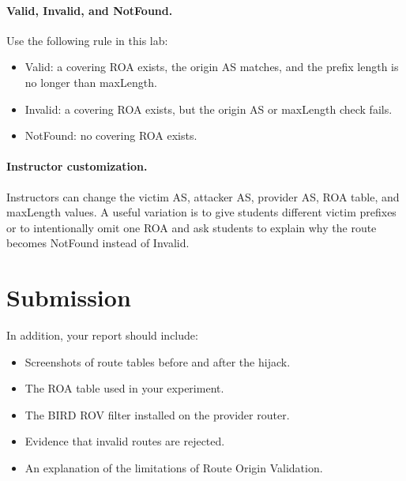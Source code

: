 \paragraph{Valid, Invalid, and NotFound.}
Use the following rule in this lab:

\begin{itemize}[noitemsep]
\item Valid: a covering ROA exists, the origin AS matches, and the prefix
      length is no longer than maxLength.
\item Invalid: a covering ROA exists, but the origin AS or maxLength check
      fails.
\item NotFound: no covering ROA exists.
\end{itemize}

\paragraph{Instructor customization.}
Instructors can change the victim AS, attacker AS, provider AS, ROA table, and
maxLength values. A useful variation is to give students different victim
prefixes or to intentionally omit one ROA and ask students to explain why the
route becomes NotFound instead of Invalid.


\section{Submission}



In addition, your report should include:

\begin{itemize}[noitemsep]
\item Screenshots of route tables before and after the hijack.
\item The ROA table used in your experiment.
\item The BIRD ROV filter installed on the provider router.
\item Evidence that invalid routes are rejected.
\item An explanation of the limitations of Route Origin Validation.
\end{itemize}


